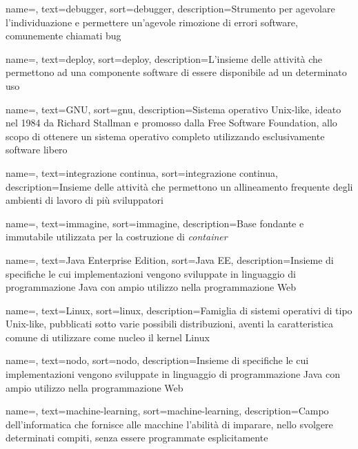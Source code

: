 {
    name=,
    text=debugger,
    sort=debugger,
    description={Strumento per agevolare l'individuazione e permettere un'agevole rimozione di errori software, comunemente chiamati bug}
}

{
    name=,
    text=deploy,
    sort=deploy,
    description={L'insieme delle attività che permettono ad una componente software di essere disponibile ad un determinato uso}
}

{
    name=,
    text=GNU,
    sort=gnu,
    description={Sistema operativo Unix-like, ideato nel 1984 da Richard Stallman e promosso dalla Free Software Foundation, allo scopo di ottenere un sistema operativo completo utilizzando esclusivamente software libero}
}

{
    name=,
    text=integrazione continua,
    sort=integrazione continua,
    description={Insieme delle attività che permettono un allineamento frequente degli ambienti di lavoro di più sviluppatori}
}

{
    name=,
    text=immagine,
    sort=immagine,
    description={Base fondante e immutabile utilizzata per la costruzione di \textit{container}}
}
 
{
    name=,
    text=Java Enterprise Edition,
    sort=Java EE,
    description={Insieme di specifiche le cui implementazioni vengono sviluppate in linguaggio di programmazione Java con ampio utilizzo nella programmazione Web}
}

{
    name=,
    text=Linux,
    sort=linux,
    description={Famiglia di sistemi operativi di tipo Unix-like, pubblicati sotto varie possibili distribuzioni, aventi la caratteristica comune di utilizzare come nucleo il kernel Linux}
}

{
    name=,
    text=nodo,
    sort=nodo,
    description={Insieme di specifiche le cui implementazioni vengono sviluppate in linguaggio di programmazione Java con ampio utilizzo nella programmazione Web}
}

{
    name=,
    text=machine-learning,
    sort=machine-learning,
    description={Campo dell'informatica che fornisce alle macchine l'abilità di imparare, nello svolgere determinati compiti, senza essere programmate esplicitamente}
}

